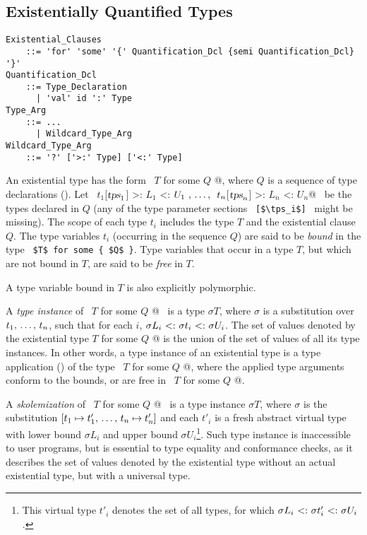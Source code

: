 \subsection{Existentially Quantified Types}
\label{sec:existential-types}

\grammar\begin{lstlisting}
Existential_Clauses
    ::= 'for' 'some' '{' Quantification_Dcl {semi Quantification_Dcl} '}'
Quantification_Dcl
    ::= Type_Declaration
      | 'val' id ':' Type
Type_Arg
    ::= ...
      | Wildcard_Type_Arg
Wildcard_Type_Arg
    ::= '?' ['>:' Type] ['<:' Type] 
\end{lstlisting}

An existential type has the form ~\lstinline@$T$ for some { $Q$ }@, where $Q$ is a sequence of type declarations (). Let ~\lstinline@$t_1$[$\mbox{\sl tps}_1$] >: $L_1$ <: $U_1\ ,\, \ldots ,\,\ t_n$[$\mbox{\sl tps}_n$] >: $L_n$ <: $U_n$@~ be the types declared in $Q$ (any of the type parameter sections ~\lstinline![$\tps_i$]!~ might be missing). The scope of each type $t_i$ includes the type $T$ and the existential clause $Q$. The type variables $t_i$ (occurring in the sequence $Q$) are said to be {\em bound} in the type ~\lstinline!$T$ for some { $Q$ }!. Type variables that occur in a type $T$, but which are not bound in $T$, are said to be {\em free} in $T$. 

A type variable bound in $T$ is also explicitly polymorphic. 

A {\em type instance} of ~\lstinline@$T$ for some { $Q$ }@~ is a type $\sigma T$, where $\sigma$ is a substitution over $t_1 ,\, \ldots ,\, t_n$, such that for each $i$, $\sigma L_i \conforms \sigma t_i \conforms \sigma U_i$. The set of values denoted by the existential type \lstinline@$T$ for some { $Q$ }@ is the union of the set of values of all its type instances. In other words, a type instance of an existential type is a type application () of the type ~\lstinline@$T$ for some { $Q$ }@, where the applied type arguments conform to the bounds, or are free in ~\lstinline@$T$ for some { $Q$ }@. 

A {\em skolemization} of ~\lstinline@$T$ for some { $Q$ }@~ is a type instance $\sigma T$, where $\sigma$ is the substitution $[t_1 \mapsto t'_1 ,\, \ldots ,\, t_n \mapsto t'_n]$ and each $t'_i$ is a fresh abstract virtual type with lower bound $\sigma L_i$ and upper bound $\sigma U_i$\footnote{This virtual type $t'_i$ denotes the set of all types, for which $\sigma L_i \conforms \sigma t'_i \conforms \sigma U_i$.}. Such type instance is inaccessible to user programs, but is essential to type equality and conformance checks, as it describes the set of values denoted by the existential type without an actual existential type, but with a universal type. 




